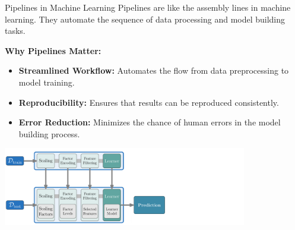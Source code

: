 \documentclass[11pt,compress,t,notes=noshow, xcolor=table]{beamer}
\begin{document}
\begin{vbframe}{Pipelines in Machine Learning}
Pipelines are like the assembly lines in machine learning. They automate the sequence of data processing and model building tasks.
\vspace{1em}

\textbf{Why Pipelines Matter:}
\begin{itemize}
\item \small \textbf{Streamlined Workflow:} Automates the flow from data preprocessing to model training.
\item \small \textbf{Reproducibility:} Ensures that results can be reproduced consistently.
\item \small \textbf{Error Reduction:} Minimizes the chance of human errors in the model building process.
\end{itemize}

\begin{center}
\includegraphics[width = 0.8\textwidth]{figure_man/linear_pipeline-no_circle.png}
\end{center}

\end{vbframe}

\endlecture
\end{document}
